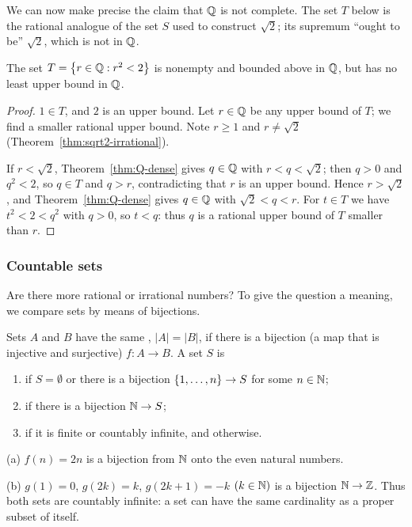 We can now make precise the claim that $\mathbb{Q}$ is not complete. The set $T$
below is the rational analogue of the set $S$ used to construct $\sqrt2$;
its supremum ``ought to be'' $\sqrt2$, which is not in $\mathbb{Q}$.

\begin{proposition}\label{prop:Q-incomplete}
    The set $T=\left\{r\in\mathbb{Q}: r^2<2\right\}$ is nonempty and bounded above in $\mathbb{Q}$,
    but has no least upper bound in $\mathbb{Q}$.
\end{proposition}

\begin{proof}
    $1\in T$, and $2$ is an upper bound. Let $r\in\mathbb{Q}$ be any upper bound of
    $T$; we find a smaller rational upper bound. Note $r\geq1$ and
    $r\neq\sqrt2$ (Theorem~\ref{thm:sqrt2-irrational}).

    If $r<\sqrt2$, Theorem~\ref{thm:Q-dense} gives $q\in\mathbb{Q}$ with
    $r<q<\sqrt2$; then $q>0$ and $q^2<2$, so $q\in T$ and $q>r$,
    contradicting that $r$ is an upper bound. Hence $r>\sqrt2$, and
    Theorem~\ref{thm:Q-dense} gives $q\in\mathbb{Q}$ with $\sqrt2<q<r$. For $t\in T$
    we have $t^2<2<q^2$ with $q>0$, so $t<q$: thus $q$ is a rational upper
    bound of $T$ smaller than $r$.
\end{proof}

\subsubsection{Countable sets}
Are there more rational or irrational numbers? To give the question a
meaning, we compare sets by means of bijections.

\begin{definition}
    Sets $A$ and $B$ have the same , $|A|=|B|$, if there
    is a bijection (a map that is injective and surjective) $f:A\to B$. A set
    $S$ is
    \begin{enumerate}[label=(\arabic*)]
        \item {} if $S=\emptyset$ or there is a bijection
        $\left\{1,\ldots,n\right\}\to S$ for some $n\in\mathbb{N}$;
        \item {} if there is a bijection $\mathbb{N}\to S$;
        \item {} if it is finite or countably infinite, and
         otherwise.
    \end{enumerate}
\end{definition}

\begin{example}
    (a) $f(n)=2n$ is a bijection from $\mathbb{N}$ onto the even natural numbers.

    (b) $g(1)=0$, $g(2k)=k$, $g(2k+1)=-k$ $(k\in\mathbb{N})$ is a bijection
    $\mathbb{N}\to\mathbb{Z}$. Thus both sets are countably infinite: a set can have the
    same cardinality as a proper subset of itself.
\end{example}
